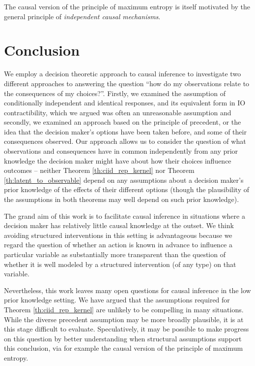The causal version of the principle of maximum entropy is itself motivated by the general principle of \emph{independent causal mechanisms}. 


\section{Conclusion}

We employ a decision theoretic approach to causal inference to investigate two different approaches to answering the question ``how do my observations relate to the consequences of my choices?''. Firstly, we examined the assumption of conditionally independent and identical responses, and its equivalent form in IO contractibility, which we argued was often an unreasonable assumption and secondly, we examined an approach based on the principle of precedent, or the idea that the decision maker's options have been taken before, and some of their consequences observed. Our approach allows us to consider the question of what observations and consequences have in common independently from any prior knowledge the decision maker might have about how their choices influence outcomes -- neither Theorem \ref{th:ciid_rep_kernel} nor Theorem \ref{th:latent_to_observable} depend on any assumptions about a decision maker's prior knowledge of the effects of their different options (though the plausibility of the assumptions in both theorems may well depend on such prior knowledge).

The grand aim of this work is to facilitate causal inference in situations where a decision maker has relatively little causal knowledge at the outset. We think avoiding structured interventions in this setting is advantageous because we regard the question of whether an action is known in advance to influence a particular variable as substantially more transparent than the question of whether it is well modeled by a structured intervention (of any type) on that variable.

Nevertheless, this work leaves many open questions for causal inference in the low prior knowledge setting. We have argued that the assumptions required for Theorem \ref{th:ciid_rep_kernel} are unlikely to be compelling in many situations. While the diverse precedent assumption may be more broadly plausible, it is at this stage difficult to evaluate. Speculatively, it may be possible to make progress on this question by better understanding when structural assumptions support this conclusion, via for example the causal version of the principle of maximum entropy.

